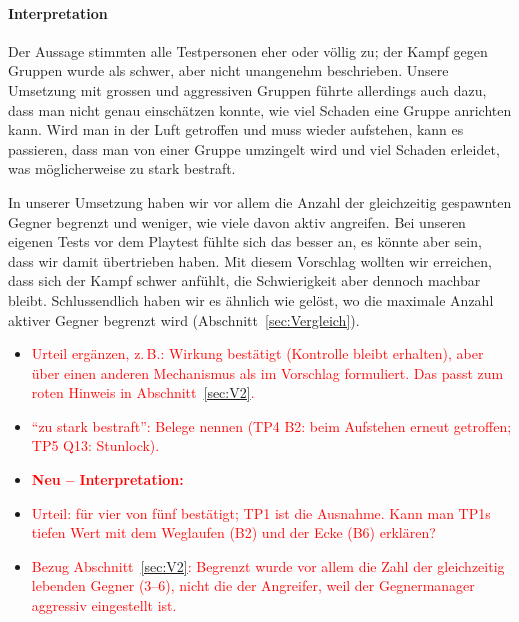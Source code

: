 \documentclass[../Main.tex]{subfiles}
\begin{document}
\paragraph{Interpretation}
Der Aussage stimmten alle Testpersonen eher oder völlig zu; der Kampf gegen Gruppen wurde als schwer, aber nicht unangenehm beschrieben. Unsere Umsetzung mit grossen und aggressiven Gruppen führte allerdings auch dazu, dass man nicht genau einschätzen konnte, wie viel Schaden eine Gruppe anrichten kann. Wird man in der Luft getroffen und muss wieder aufstehen, kann es passieren, dass man von einer Gruppe umzingelt wird und viel Schaden erleidet, was möglicherweise zu stark bestraft.

In unserer Umsetzung haben wir vor allem die Anzahl der gleichzeitig gespawnten Gegner begrenzt und weniger, wie viele davon aktiv angreifen. Bei unseren eigenen Tests vor dem Playtest fühlte sich das besser an, es könnte aber sein, dass wir damit übertrieben haben. Mit diesem Vorschlag wollten wir erreichen, dass sich der Kampf schwer anfühlt, die Schwierigkeit aber dennoch machbar bleibt. Schlussendlich haben wir es ähnlich wie  gelöst, wo die maximale Anzahl aktiver Gegner begrenzt wird (Abschnitt~\ref{sec:Vergleich}).

\begin{itemize}[leftmargin=1.5cm]
    \item \textcolor{red}{Urteil ergänzen, z.\,B.: Wirkung bestätigt (Kontrolle bleibt erhalten), aber über einen anderen Mechanismus als im Vorschlag formuliert. Das passt zum roten Hinweis in Abschnitt~\ref{sec:V2}.}
    \item \textcolor{red}{\enquote{zu stark bestraft}: Belege nennen (TP4 B2: beim Aufstehen erneut getroffen; TP5 Q13: Stunlock).}
\end{itemize}

\begin{itemize}[leftmargin=1.5cm]
    \item \textcolor{red}{\textbf{Neu -- Interpretation:}}
    \item \textcolor{red}{Urteil: für vier von fünf bestätigt; TP1 ist die Ausnahme. Kann man TP1s tiefen Wert mit dem Weglaufen (B2) und der Ecke (B6) erklären?}
    \item \textcolor{red}{Bezug Abschnitt~\ref{sec:V2}: Begrenzt wurde vor allem die Zahl der gleichzeitig lebenden Gegner (3--6), nicht die der Angreifer, weil der Gegnermanager aggressiv eingestellt ist.}
\end{itemize}
\end{document}
